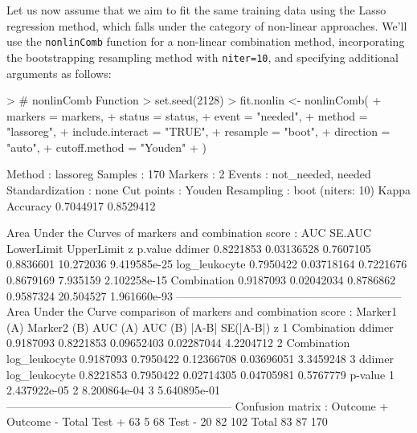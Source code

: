\documentclass[10pt]{article}
\begin{document}
Let us now assume that we aim to fit the same training data using the Lasso regression method, which falls under the category of non-linear approaches. We'll use the \texttt{nonlinComb} function for a non-linear combination method, incorporating the bootstrapping resampling method with \texttt{niter=10}, and specifying additional arguments as follows:
\begin{Schunk}
\begin{Sinput}
> # nonlinComb Function
> set.seed(2128)
> fit.nonlin <- nonlinComb(
+   markers = markers,
+   status = status,
+   event = "needed",
+   method = "lassoreg",
+   include.interact = "TRUE",
+   resample = "boot",
+   direction = "auto",
+   cutoff.method = "Youden"
+ )
\end{Sinput}
\begin{Soutput}
Method : lassoreg 
Samples : 170 
Markers : 2 
Events : not_needed, needed 
Standardization : none 
Cut points : Youden 
Resampling : boot (niters: 10)
 Kappa       Accuracy  
 0.7044917   0.8529412

Area Under the Curves of markers and combination score :  
                    AUC     SE.AUC LowerLimit UpperLimit         z      p.value
ddimer        0.8221853 0.03136528  0.7607105  0.8836601 10.272036 9.419585e-25
log_leukocyte 0.7950422 0.03718164  0.7221676  0.8679169  7.935159 2.102258e-15
Combination   0.9187093 0.02042034  0.8786862  0.9587324 20.504527 1.961660e-93
------------------------------------------------------------ 
Area Under the Curve comparison of markers and combination score :  
  Marker1 (A)   Marker2 (B)   AUC (A)   AUC (B)      |A-B|  SE(|A-B|)         z
1 Combination        ddimer 0.9187093 0.8221853 0.09652403 0.02287044 4.2204712
2 Combination log_leukocyte 0.9187093 0.7950422 0.12366708 0.03696051 3.3459248
3      ddimer log_leukocyte 0.8221853 0.7950422 0.02714305 0.04705981 0.5767779
       p-value
1 2.437922e-05
2 8.200864e-04
3 5.640895e-01
------------------------------------------------------------ 
Confusion matrix :  
          Outcome +    Outcome -      Total
Test +           63            5         68
Test -           20           82        102
Total            83           87        170


\end{Soutput}
\end{Schunk}
\end{document}
